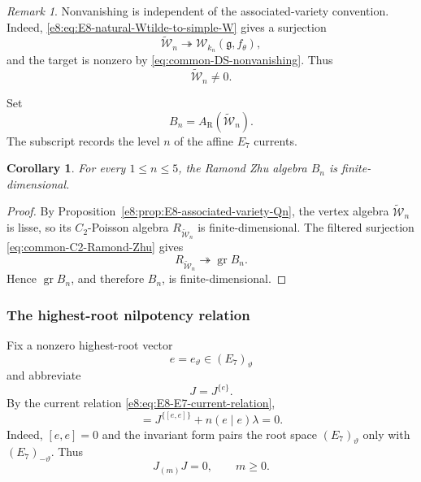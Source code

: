 \documentclass[11pt,reqno]{amsart}
\newtheorem{corollary}[theorem]{Corollary}
\theoremstyle{definition}
\theoremstyle{remark}
\newtheorem{remark}[theorem]{Remark}
\providecommand{\g}{\mathfrak{g}}
\providecommand{\W}{\mathcal{W}}
\providecommand{\gr}{\operatorname{gr}}
\begin{document}
\begin{remark}

Nonvanishing is independent of the associated-variety convention.  Indeed,
\eqref{e8:eq:E8-natural-Wtilde-to-simple-W} gives a surjection
\begin{equation*}
  \widetilde{\W}_n\twoheadrightarrow
  \W_{k_n}(\g,f_{\theta}),
\end{equation*}
and the target is nonzero by
\eqref{eq:common-DS-nonvanishing}.  Thus
\begin{equation*}
  \widetilde{\W}_n\neq0.
\end{equation*}
\end{remark}

Set
\begin{equation*}
  B_n=A_{\mathrm R}(\widetilde{\W}_n).
\end{equation*}
The subscript records the level $n$ of the affine $E_7$ currents.

\begin{corollary}
\label{e8:cor:E8-Bn-finite-dimensional}
For every $1\le n\le5$, the Ramond Zhu algebra $B_n$ is finite-dimensional.
\end{corollary}

\begin{proof}
By Proposition~\ref{e8:prop:E8-associated-variety-Qn}, the vertex algebra
$\widetilde{\W}_n$ is lisse, so its $C_2$-Poisson algebra
$R_{\widetilde{\W}_n}$ is finite-dimensional.  The filtered surjection
\eqref{eq:common-C2-Ramond-Zhu} gives
\begin{equation*}
  R_{\widetilde{\W}_n}\twoheadrightarrow\gr B_n.
\end{equation*}
Hence $\gr B_n$, and therefore $B_n$, is finite-dimensional.
\end{proof}

\subsubsection{The highest-root nilpotency relation}


Fix a nonzero highest-root vector
\begin{equation*}
  e=e_{\vartheta}\in(E_7)_{\vartheta}
\end{equation*}
and abbreviate
\begin{equation*}
  J=J^{\{e\}}.
\end{equation*}
By the current relation \eqref{e8:eq:E8-E7-current-relation},
\begin{equation*}
  [J_{\lambda}J]
  =J^{\{[e,e]\}}+n(e\mid e)\lambda=0.
\end{equation*}
Indeed, $[e,e]=0$ and the invariant form pairs the root space
$(E_7)_{\vartheta}$ only with $(E_7)_{-\vartheta}$.  Thus
\begin{equation}
  J_{(m)}J=0,
  \qquad m\ge0.
  \label{e8:eq:E8-J-nonnegative-products-zero}
\end{equation}
\end{document}
